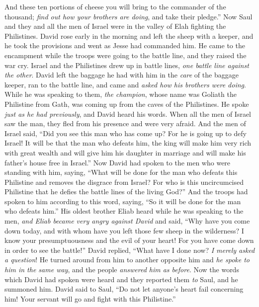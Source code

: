 \begin{biblechapter}
\verse And these ten portions of cheese you will bring to the commander of the thousand; \textit{find out how your brothers are doing}, and take their pledge.”
\verse Now Saul and they and all the men of Israel were in the valley of Elah fighting the Philistines.
\verse David rose early in the morning and left the sheep with a keeper, and he took the provisions and went as Jesse had commanded him. He came to the encampment while the troops were going to the battle line, and they raised the war cry.
\verse Israel and the Philistines drew up in battle lines, \textit{one battle line against the other}.
\verse David left the baggage he had with him in the \textit{care} of the baggage keeper, ran to the battle line, and came and \textit{asked how his brothers were doing}.
\verse While he was speaking to them, \textit{the champion}, whose name was Goliath the Philistine from Gath, was coming up from the caves of the Philistines. He spoke \textit{just as he had previously}, and David heard his words.
\verse When all the men of Israel saw the man, they fled from his presence and were very afraid.
\verse And the men of Israel said, “Did you see this man who has come up? For he is going up to defy Israel! It will be that the man who defeats him, the king will make him very rich with great wealth and will give him his daughter in marriage and will make his father’s house free in Israel.”
\verse Now David had spoken to the men who were standing with him, saying, “What will be done for the man who defeats this Philistine and removes the disgrace from Israel? For who is this uncircumcised Philistine that he defies the battle lines of the living God?”
\verse And the troops had spoken to him according to this word, saying, “So it will be done for the man who defeats him.”
\verse His oldest brother Eliab heard while he was speaking to the men, \textit{and Eliab became very angry against David} and said, “Why have you come down today, and with whom have you left those few sheep in the wilderness? I know your presumptuousness and the evil of your heart! For you have come down in order to see the battle!”
\verse David replied, “What have I done now? \textit{I merely asked a question}!
\verse He turned around from him to another opposite him and \textit{he spoke to him in the same way}, and the people \textit{answered him as before}.
 Now the words which David had spoken were heard and they reported them \textit{to} Saul, and he summoned him.
\verse David said to Saul, “Do not let anyone’s heart fail concerning him! Your servant will go and fight with this Philistine.”

\end{biblechapter}
